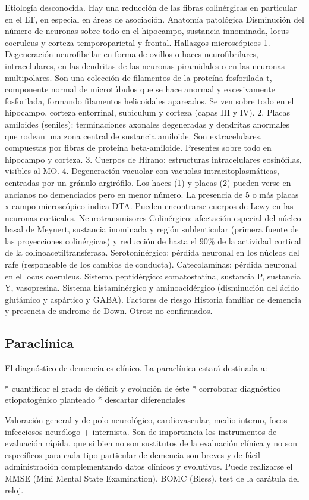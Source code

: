 Etiología desconocida. Hay una reducción de las fibras colinérgicas en particular en el LT, en especial en áreas de asociación. Anatomía patológica Disminución del número de neuronas sobre todo en el hipocampo, sustancia innominada, locus coeruleus y corteza temporoparietal y frontal. Hallazgos microscópicos 1. Degeneración neurofibrilar en forma de ovillos o haces neurofibrilares, intracelulares, en las dendritas de las neuronas piramidales o en las neuronas multipolares. Son una colección de filamentos de la proteína fosforilada t, componente normal de microtúbulos que se hace anormal y excesivamente fosforilada, formando filamentos helicoidales apareados. Se ven sobre todo en el hipocampo, corteza entorrinal, subiculum y corteza (capas III y IV). 2. Placas amiloides (seniles): terminaciones axonales degeneradas y dendritas anormales que rodean una zona central de sustancia amiloide. Son extracelulares, compuestas por fibras de proteína beta-amiloide. Presentes sobre todo en hipocampo y corteza. 3. Cuerpos de Hirano: estructuras intracelulares eosinófilas, visibles al MO. 4. Degeneración vacuolar con vacuolas intracitoplasmáticas, centradas por un gránulo argirófilo. Los haces (1) y placas (2) pueden verse en ancianos no demenciados pero en menor número. La presencia de 5 o más placas x campo microscópico indica DTA. Pueden encontrarse cuerpos de Lewy en las neuronas corticales. Neurotransmisores Colinérgico: afectación especial del núcleo basal de Meynert, sustancia inominada y región sublenticular (primera fuente de las proyecciones colinérgicas) y reducción de hasta el 90\% de la actividad cortical de la colinoacetiltransferasa. Serotoninérgico: pérdida neuronal en los núcleos del rafe (responsable de los cambios de conducta). Catecolaminas: pérdida neuronal en el locus coeruleus. Sistema peptidérgico: somatostatina, sustancia P, sustancia Y, vasopresina. Sistema histaminérgico y aminoacidérgico (disminución del ácido glutámico y aspártico y GABA). Factores de riesgo Historia familiar de demencia y presencia de sndrome de Down. Otros: no confirmados.
\subsection*{Paraclínica}
El diagnóstico de demencia es clínico. La paraclínica estará destinada a:

* cuantificar el grado de déficit y evolución de éste
* corroborar diagnóstico etiopatogénico planteado
* descartar diferenciales

Valoración general y de polo neurológico, cardiovascular, medio interno, focos infecciosos neurólogo + internista. Son de importancia los instrumentos de evaluación rápida, que si bien no son sustitutos de la evaluación clínica y no son específicos para cada tipo particular de demencia son breves y de fácil administración complementando datos clínicos y evolutivos. Puede realizarse el MMSE (Mini Mental State Examination), BOMC (Bless), test de la carátula del reloj.

